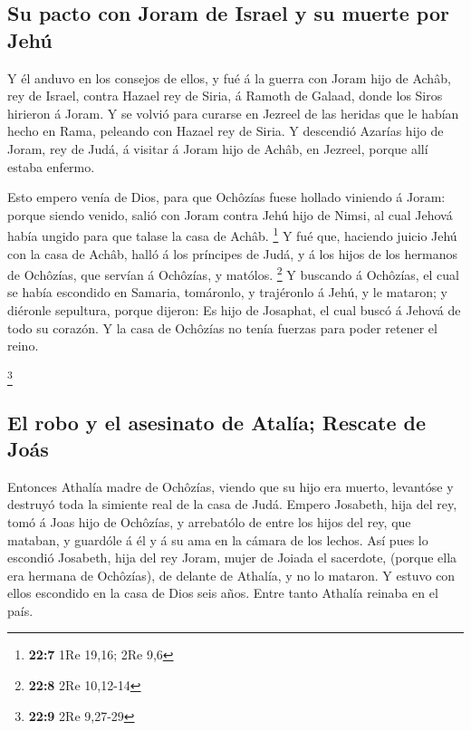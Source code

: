 \hypertarget{su-pacto-con-joram-de-israel-y-su-muerte-por-jehuxfa}{%
\subsection{Su pacto con Joram de Israel y su muerte por
Jehú}\label{su-pacto-con-joram-de-israel-y-su-muerte-por-jehuxfa}}

 Y él anduvo en los consejos de ellos, y fué á la guerra
con Joram hijo de Achâb, rey de Israel, contra Hazael rey de Siria, á
Ramoth de Galaad, donde los Siros hirieron á Joram.  Y se
volvió para curarse en Jezreel de las heridas que le habían hecho en
Rama, peleando con Hazael rey de Siria. Y descendió Azarías hijo de
Joram, rey de Judá, á visitar á Joram hijo de Achâb, en Jezreel, porque
allí estaba enfermo.

 Esto empero venía de Dios, para que Ochôzías fuese
hollado viniendo á Joram: porque siendo venido, salió con Joram contra
Jehú hijo de Nimsi, al cual Jehová había ungido para que talase la casa
de Achâb. \footnote{\textbf{22:7} 1Re 19,16; 2Re 9,6}  Y
fué que, haciendo juicio Jehú con la casa de Achâb, halló á los
príncipes de Judá, y á los hijos de los hermanos de Ochôzías, que
servían á Ochôzías, y matólos. \footnote{\textbf{22:8} 2Re 10,12-14}
 Y buscando á Ochôzías, el cual se había escondido en
Samaria, tomáronlo, y trajéronlo á Jehú, y le mataron; y diéronle
sepultura, porque dijeron: Es hijo de Josaphat, el cual buscó á Jehová
de todo su corazón. Y la casa de Ochôzías no tenía fuerzas para poder
retener el reino.

\footnote{\textbf{22:9} 2Re 9,27-29}

\hypertarget{el-robo-y-el-asesinato-de-ataluxeda-rescate-de-jouxe1s}{%
\subsection{El robo y el asesinato de Atalía; Rescate de
Joás}\label{el-robo-y-el-asesinato-de-ataluxeda-rescate-de-jouxe1s}}

 Entonces Athalía madre de Ochôzías, viendo que su hijo
era muerto, levantóse y destruyó toda la simiente real de la casa de
Judá.  Empero Josabeth, hija del rey, tomó á Joas hijo de
Ochôzías, y arrebatólo de entre los hijos del rey, que mataban, y
guardóle á él y á su ama en la cámara de los lechos. Así pues lo
escondió Josabeth, hija del rey Joram, mujer de Joiada el sacerdote,
(porque ella era hermana de Ochôzías), de delante de Athalía, y no lo
mataron.  Y estuvo con ellos escondido en la casa de Dios
seis años. Entre tanto Athalía reinaba en el país.


